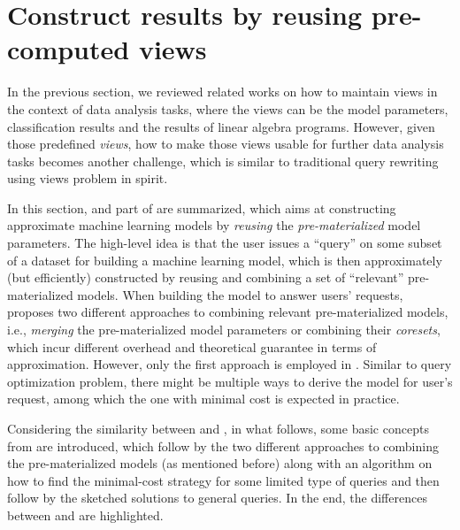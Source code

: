 \section{Construct results by reusing pre-computed views}\label{sec: view_reuse}
In the previous section, we reviewed related works on how to maintain views in the context of data analysis tasks, where the views can be the model parameters, classification results and the results of linear algebra programs. However, given those predefined {\em views}, how to make those views usable for further data analysis tasks becomes another challenge, which is similar to traditional query rewriting using views problem \cite{halevy2001answering} in spirit.

In this section, \cite{hasani2018efficient} and part of \cite{gupta2015processing} are summarized, which aims at constructing approximate machine learning models by {\em reusing} the {\em pre-materialized} model parameters. The high-level idea is that the user issues a ``query'' on some subset of a dataset for building a machine learning model, which is then approximately (but efficiently) constructed by reusing and combining a set of ``relevant'' pre-materialized models. When building the model to answer users' requests, \cite{hasani2018efficient} proposes two different approaches to combining relevant pre-materialized models, i.e., {\em merging} the pre-materialized model parameters or combining their {\em coresets}, which incur different overhead and theoretical guarantee in terms of approximation.  However, only the first approach is employed in \cite{gupta2015processing}. Similar to query optimization problem, there might be multiple ways to derive the model for user's request, among which the one with minimal cost is expected in practice.

Considering the similarity between \cite{hasani2018efficient} and \cite{gupta2015processing}, in what follows, some basic concepts from \cite{hasani2018efficient} are introduced, which follow by the two different approaches to combining the pre-materialized models (as mentioned before) along with an algorithm on how to find the minimal-cost strategy for some limited type of queries and then follow by the sketched solutions to general queries. In the end, the differences between \cite{hasani2018efficient} and \cite{gupta2015processing} are highlighted.



